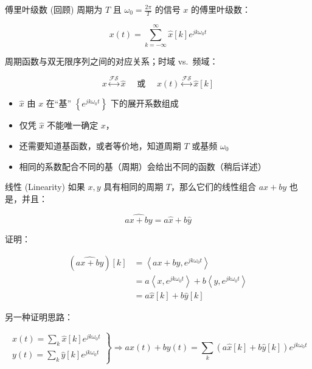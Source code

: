 \documentclass[
  ignorenonframetext,
]{beamer}
\providecommand{\tightlist}{%
  \setlength{\itemsep}{0pt}\setlength{\parskip}{0pt}}
\begin{document}
\begin{frame}{傅里叶级数 (回顾)}
\protect{}\label{ux5085ux91ccux53f6ux7ea7ux6570-ux56deux987e}
周期为 \(T\) 且 \(\omega_{0}=\frac{2 \pi}{T}\) 的信号 \(x\)
的傅里叶级数：

\[
x(t)=\sum_{k=-\infty}^{\infty} \hat{x}[k] e^{j k \omega_{0} t}
\]

周期函数与双无限序列之间的对应关系；时域 vs.~频域：

\[
x \stackrel{\mathcal{F S}}{\longleftrightarrow} \hat{x} \quad \text { 或 } \quad x(t) \stackrel{\mathcal{F S}}{\longleftrightarrow} \hat{x}[k]
\]

\begin{itemize}
\tightlist
\item
  \(\hat{x}\) 由 \(x\) 在``基'' \(\left\{e^{j k \omega_{0} t}\right\}\)
  下的展开系数组成
\item
  仅凭 \(\hat{x}\) 不能唯一确定 \(x\)，
\item
  还需要知道基函数，或者等价地，知道周期 \(T\) 或基频 \(\omega_{0}\)
\item
  相同的系数配合不同的基（周期）会给出不同的函数（稍后详述）
\end{itemize}
\end{frame}

\begin{frame}{线性 (Linearity)}
\protect{}\label{ux7ebfux6027-linearity}
如果 \(x, y\) 具有相同的周期 \(T\)，那么它们的线性组合 \(a x+b y\)
也是，并且：

\[
\widehat{a x+b y}=a \hat{x}+b \hat{y}
\]

证明：

\[
\begin{aligned}
(\widehat{a x+b y})[k] & =\left\langle a x+b y, e^{j k \omega_{0} t}\right\rangle \\
& =a\left\langle x, e^{j k \omega_{0} t}\right\rangle+b\left\langle y, e^{j k \omega_{0} t}\right\rangle \\
& =a \hat{x}[k]+b \hat{y}[k]
\end{aligned}
\]

另一种证明思路：

\[
\left.\begin{array}{l}
x(t)=\sum_{k} \hat{x}[k] e^{j k \omega_{0} t} \\
y(t)=\sum_{k} \hat{y}[k] e^{j k \omega_{0} t}
\end{array}\right\} \Longrightarrow a x(t)+b y(t)=\sum_{k}(a \hat{x}[k]+b \hat{y}[k]) e^{j k \omega_{0} t}
\]
\end{frame}
\end{document}

